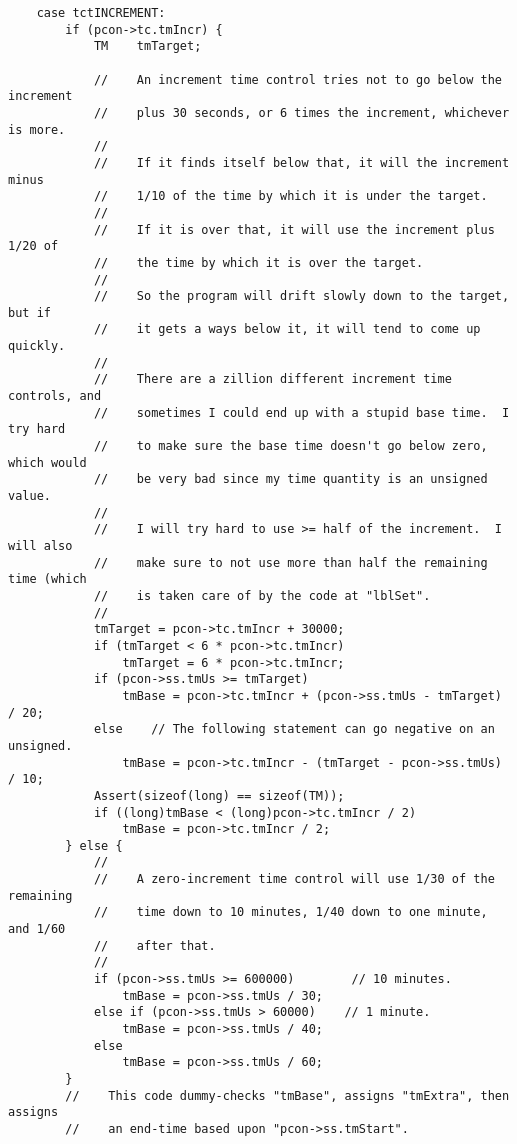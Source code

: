 \documentclass[10pt,dvipdfmx]{report}
\begin{document}
{\scriptsize
\begin{verbatim}
    case tctINCREMENT:
        if (pcon->tc.tmIncr) {
            TM    tmTarget;

            //    An increment time control tries not to go below the increment
            //    plus 30 seconds, or 6 times the increment, whichever is more.
            //
            //    If it finds itself below that, it will the increment minus
            //    1/10 of the time by which it is under the target.
            //
            //    If it is over that, it will use the increment plus 1/20 of
            //    the time by which it is over the target.
            //
            //    So the program will drift slowly down to the target, but if
            //    it gets a ways below it, it will tend to come up quickly.
            //
            //    There are a zillion different increment time controls, and
            //    sometimes I could end up with a stupid base time.  I try hard
            //    to make sure the base time doesn't go below zero, which would
            //    be very bad since my time quantity is an unsigned value.
            //
            //    I will try hard to use >= half of the increment.  I will also
            //    make sure to not use more than half the remaining time (which
            //    is taken care of by the code at "lblSet".
            //
            tmTarget = pcon->tc.tmIncr + 30000;
            if (tmTarget < 6 * pcon->tc.tmIncr)
                tmTarget = 6 * pcon->tc.tmIncr;
            if (pcon->ss.tmUs >= tmTarget)
                tmBase = pcon->tc.tmIncr + (pcon->ss.tmUs - tmTarget) / 20;
            else    // The following statement can go negative on an unsigned.
                tmBase = pcon->tc.tmIncr - (tmTarget - pcon->ss.tmUs) / 10;
            Assert(sizeof(long) == sizeof(TM));
            if ((long)tmBase < (long)pcon->tc.tmIncr / 2)
                tmBase = pcon->tc.tmIncr / 2;
        } else {
            //
            //    A zero-increment time control will use 1/30 of the remaining
            //    time down to 10 minutes, 1/40 down to one minute, and 1/60
            //    after that.
            //
            if (pcon->ss.tmUs >= 600000)        // 10 minutes.
                tmBase = pcon->ss.tmUs / 30;
            else if (pcon->ss.tmUs > 60000)    // 1 minute.
                tmBase = pcon->ss.tmUs / 40;
            else
                tmBase = pcon->ss.tmUs / 60;
        }
        //    This code dummy-checks "tmBase", assigns "tmExtra", then assigns
        //    an end-time based upon "pcon->ss.tmStart".

\end{verbatim}}
\end{document}
